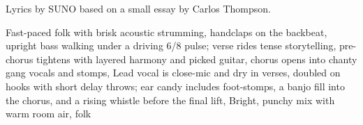 
\begin{notes}
Lyrics by SUNO based on a small essay by Carlos Thompson.
\end{notes}
\begin{style}
Fast-paced folk with brisk acoustic strumming, handclaps on the backbeat, upright bass walking under a driving 6/8 pulse; verse rides tense storytelling, pre-chorus tightens with layered harmony and picked guitar, chorus opens into chanty gang vocals and stomps, Lead vocal is close-mic and dry in verses, doubled on hooks with short delay throws; ear candy includes foot-stomps, a banjo fill into the chorus, and a rising whistle before the final lift, Bright, punchy mix with warm room air, folk
\end{style}
